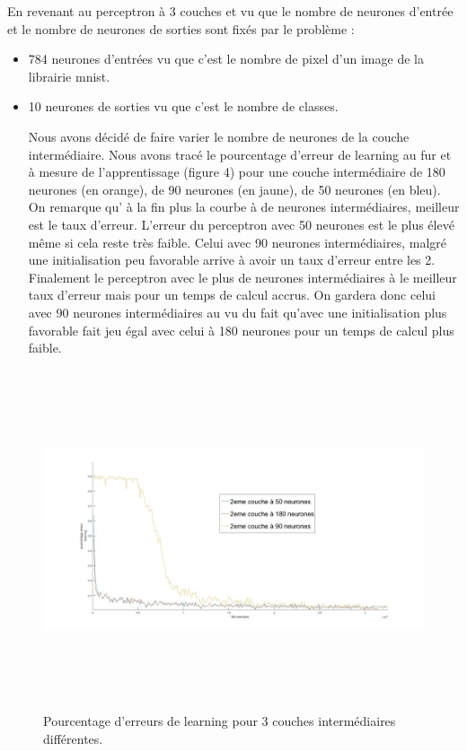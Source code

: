 \documentclass[a4paper,oneside]{report}
\begin{document}
\newpage
En revenant au perceptron à 3 couches et vu que le nombre de neurones d'entrée et le nombre de neurones de sorties sont fixés par le problème  :
\begin{itemize}
\item 784 neurones d'entrées vu que c'est le nombre de pixel d'un image de la librairie mnist.
\item 10 neurones de sorties vu que c'est le nombre de classes.


Nous avons décidé de faire varier le nombre de neurones de la couche intermédiaire. Nous avons tracé le pourcentage d'erreur de learning au fur et à mesure de l'apprentissage (figure 4) pour une couche intermédiaire de 180 neurones (en orange), de 90 neurones (en jaune), de 50 neurones (en bleu). On remarque qu' à la fin plus la courbe à de neurones intermédiaires, meilleur est le taux d'erreur. L'erreur du perceptron avec 50 neurones est le plus élevé même si cela reste très faible. Celui avec 90 neurones intermédiaires, malgré une initialisation peu favorable arrive à avoir un taux d'erreur entre les 2. Finalement le perceptron avec le plus de neurones intermédiaires à le meilleur taux d'erreur mais pour un temps de calcul accrus. On gardera donc celui avec 90 neurones intermédiaires au vu du fait qu'avec une initialisation plus favorable fait jeu égal avec celui à 180 neurones pour un temps de calcul plus faible. 
\end{itemize}
\begin{figure}[!h]
	\begin{center}
		\includegraphics[width=17cm,height=10cm]{Images/courbes3couche.jpg} 
		\caption{Pourcentage d'erreurs de learning pour 3 couches intermédiaires différentes.}
	\end{center}
\end{figure}
\end{document}
